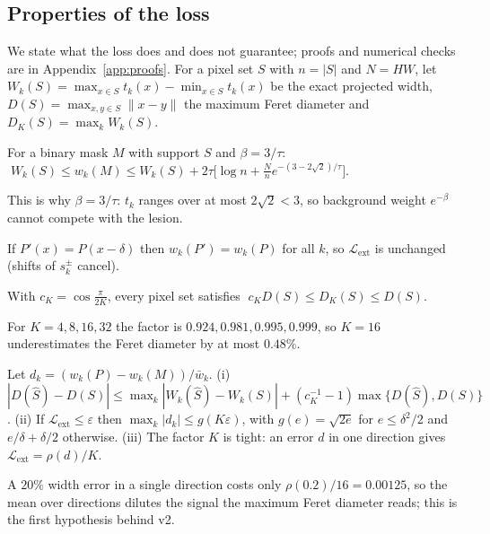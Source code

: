 \documentclass{midl}
\begin{document}
\subsection{Properties of the loss}\label{sec:theory}
We state what the loss does and does not guarantee; proofs and numerical checks are in Appendix~\ref{app:proofs}. For a pixel set $S$ with $n=|S|$ and $N=HW$, let $W_k(S)=\max_{x\in S}t_k(x)-\min_{x\in S}t_k(x)$ be the exact projected width, $D(S)=\max_{x,y\in S}\|x-y\|$ the maximum Feret diameter and $D_K(S)=\max_kW_k(S)$.

\begin{proposition}\label{prop:support}
For a binary mask $M$ with support $S$ and $\beta=3/\tau$: $\;W_k(S)\le w_k(M)\le W_k(S)+2\tau\big[\log n+\tfrac{N}{n}e^{-(3-2\sqrt2)/\tau}\big]$.
\end{proposition}
This is why $\beta=3/\tau$: $t_k$ ranges over at most $2\sqrt2<3$, so background weight $e^{-\beta}$ cannot compete with the lesion.

\begin{proposition}\label{prop:translation}
If $P'(x)=P(x-\delta)$ then $w_k(P')=w_k(P)$ for all $k$, so $\mathcal{L}_{\mathrm{ext}}$ is unchanged (shifts of $s_k^{\pm}$ cancel).
\end{proposition}

\begin{proposition}\label{prop:K}
With $c_K=\cos\frac{\pi}{2K}$, every pixel set satisfies $\;c_KD(S)\le D_K(S)\le D(S)$.
\end{proposition}
For $K=4,8,16,32$ the factor is $0.924,0.981,0.995,0.999$, so $K=16$ underestimates the Feret diameter by at most $0.48\%$.

\begin{proposition}\label{prop:dilution}
Let $d_k=(w_k(P)-w_k(M))/\bar w_k$. (i) $|D(\hat S)-D(S)|\le\max_k|W_k(\hat S)-W_k(S)|+(c_K^{-1}-1)\max\{D(\hat S),D(S)\}$. (ii) If $\mathcal{L}_{\mathrm{ext}}\le\varepsilon$ then $\max_k|d_k|\le g(K\varepsilon)$, with $g(e)=\sqrt{2e}$ for $e\le\delta^2/2$ and $e/\delta+\delta/2$ otherwise. (iii) The factor $K$ is tight: an error $d$ in one direction gives $\mathcal{L}_{\mathrm{ext}}=\rho(d)/K$.
\end{proposition}
A $20\%$ width error in a single direction costs only $\rho(0.2)/16=0.00125$, so the mean over directions dilutes the signal the maximum Feret diameter reads; this is the first hypothesis behind v2.
\end{document}
